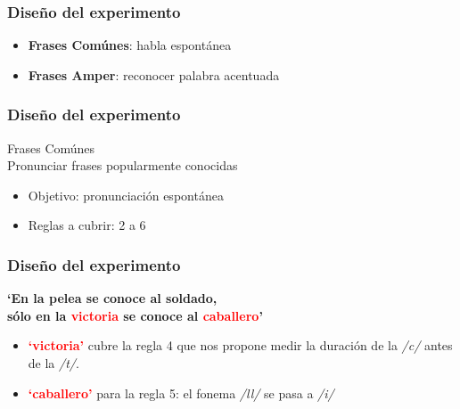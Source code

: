 \documentclass[mathserif]{beamer}%
\begin{document}
\begin{frame}
	\frametitle{Diseño del experimento}
	\begin{itemize}\itemsep=10ex
		\item \textbf{Frases Comúnes}: habla espontánea
		\item \textbf{Frases Amper}: reconocer palabra acentuada
	\end{itemize}	
\end{frame} 

\begin{frame}
	\frametitle{Diseño del experimento}
	{\Large Frases Comúnes} \\
	Pronunciar frases popularmente conocidas
	
	\begin{itemize}
		\item Objetivo: pronunciación espontánea
		\item Reglas a cubrir: 2 a 6
	\end{itemize}
\end{frame} 

\begin{frame}
	\frametitle{Diseño del experimento}
	\begin{center}
		\textbf{`En la pelea se conoce al soldado,} \\ 
		\textbf{sólo en la \textcolor{red}{victoria} se conoce al \textcolor{red}{caballero}’}
	\end{center}
	
	\begin{itemize}
		\item \textcolor{red}{\textbf{`victoria’}} cubre la regla 4 que nos propone medir la duración de la \textit{/c/} antes de la \textit{/t/}. 
		\item \textcolor{red}{\textbf{`caballero’}} para la regla 5: el fonema \textit{/ll/} se pasa a \textit{/i/} 
	\end{itemize}	
\end{frame} 
\end{document}
